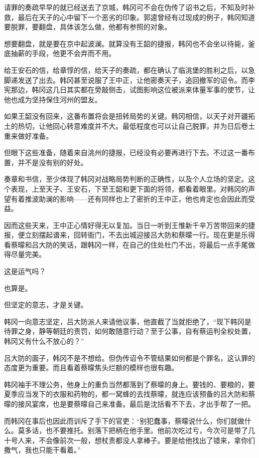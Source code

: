 请罪的奏疏早早的就已经送去了京城，韩冈可不会在伪传了诏书之后，不知及时补救，最后在天子的心中留下一个恶劣的印象。郭逵曾经有过现成的例子，韩冈知道要脱罪，要翻盘，具体该怎么做，他都有参照的对象。

想要翻盘，就是要在京中起波澜。就算没有王韶的捷报，韩冈也不会坐以待毙，釜底抽薪的手段，他更不会弃而不用。

给王安石的信，给章惇的信，给天子的奏疏，都在确认了临洮堡的胜利之后，以急脚递发送了出去。韩冈甚至说服了王中正，让他密奏天子，追回撤军的诏令。而李宪那边，韩冈这几日其实都在旁敲侧击，试图影响这位被派来体量军事的使节，让他也成为坚持保住河州的盟友。

如果王韶没有回来，这番布置将会是扭转局势的关键。韩冈相信，以天子对开疆拓土的热切，让他回心转意难度并不大。最低程度也可以让自己脱罪，并为日后卷土重来做好准备。

但眼下这些准备，随着来自洮州的捷报，已经没有必要再进行下去。不过这一番布置，并不是没有别的好处。

奏章和书信，至少体现了韩冈对战略局势判断的正确性，以及个人立场的坚定。这个表现，上至天子、王安石，下至王韶和更下面的将领，都看着眼里。对韩冈的声望有着推波助澜的影响——还有同样也上了密折的王中正，他也肯定也会因此而受益。

因而这些天来，王中正心情好得无以复加。当日一听到王惟新千辛万苦带回来的捷报，便立刻摆起谱来，回转衙门，不去出城迎接吕大防和蔡曚一行。现在更是乐得看蔡曚和吕大防的笑话，跟韩冈一样，在自己的住处杜门不出，将最后一点手尾做得尽量完美。

这是运气吗？

也算是。

但坚定的意志，才是关键。

韩冈一向意志坚定，吕大防派人来请他议事，他直截了当就拒绝了，“现下韩冈是待罪之身，静等朝廷的责罚，如何敢随意行动？至于公事，自有蔡运判全权处置，韩冈又有什么不放心的？”

吕大防的面子，韩冈不是不想给。但伪传诏令不管结果如何都是个罪名，这认罪的态度更为重要。而且看着蔡曚焦头烂额的模样也很有趣。

韩冈袖手不理公务，他身上的重负当然都落到了蔡曚的身上。要钱的、要粮的，要夏季应当发下的衣服和药物的，都一窝蜂的去找蔡曚，就连应该预备的吕大防和蔡曚的接风宴席，也是要蔡曚自己来准备。最后是沈括看不下去，才出手帮了一把。

而韩冈在事后也因此而训斥了手下的官吏：“别犯蠢事，蔡曚说什么，你们就做什么。莫多话，也不要推托。别落下把柄在他手里。他前次吃过亏，今次可是带了几十号人来，不会像前次一般，想杖责都没人拿棒子。要是给他找出了错来，拿你们撒气，我也只能干看着。”

